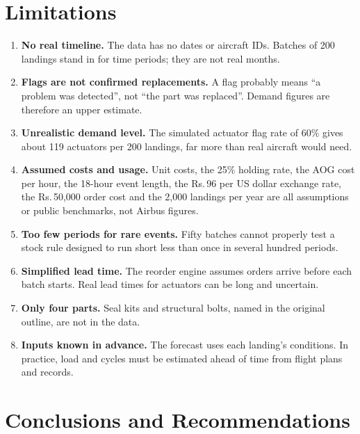 \documentclass[12pt,oneside]{report}
\newcommand{\INR}{Rs.\,}
\begin{document}
\chapter{Limitations}
\label{ch:limits}

\begin{enumerate}
\item \textbf{No real timeline.} The data has no dates or aircraft IDs. Batches of 200 landings stand in for time periods; they are not real months.
\item \textbf{Flags are not confirmed replacements.} A flag probably means ``a problem was detected'', not ``the part was replaced''. Demand figures are therefore an upper estimate.
\item \textbf{Unrealistic demand level.} The simulated actuator flag rate of 60\% gives about 119 actuators per 200 landings, far more than real aircraft would need.
\item \textbf{Assumed costs and usage.} Unit costs, the 25\% holding rate, the AOG cost per hour, the 18-hour event length, the \INR 96 per US dollar exchange rate, the \INR 50,000 order cost and the 2,000 landings per year are all assumptions or public benchmarks, not Airbus figures.
\item \textbf{Too few periods for rare events.} Fifty batches cannot properly test a stock rule designed to run short less than once in several hundred periods.
\item \textbf{Simplified lead time.} The reorder engine assumes orders arrive before each batch starts. Real lead times for actuators can be long and uncertain.
\item \textbf{Only four parts.} Seal kits and structural bolts, named in the original outline, are not in the data.
\item \textbf{Inputs known in advance.} The forecast uses each landing's conditions. In practice, load and cycles must be estimated ahead of time from flight plans and records.
\end{enumerate}

\chapter{Conclusions and Recommendations}
\label{ch:concl}
\end{document}
